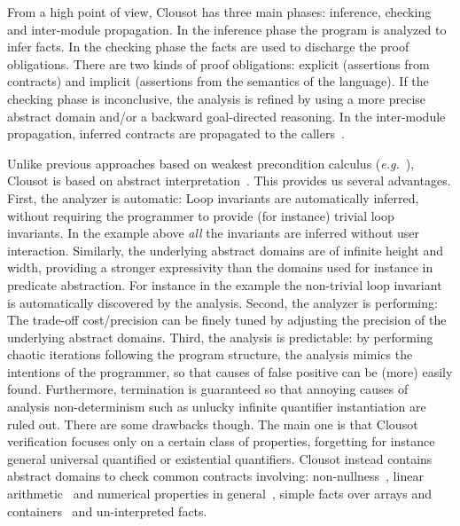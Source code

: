 \documentclass{llncs}
\begin{document}
From a high point of view, Clousot has three main phases: inference, checking and inter-module propagation. 
In the inference phase the program is analyzed to infer facts. 
In the checking phase the facts are used to discharge the proof obligations. 
There are two kinds of proof obligations: explicit (assertions from contracts) and implicit (assertions from the semantics of the language). 
If the checking phase is inconclusive, the analysis is refined by using a more precise abstract domain and/or a backward goal-directed reasoning.
In the inter-module propagation, inferred contracts are propagated to the callers~\cite{CousotCousotLogozzo-Pre}.

Unlike previous approaches based on weakest precondition calculus (\emph{e.g.}~\cite{ESCJava,ChalinEtAl-FMCO05,LeinoBoogie,Jack,Why}), Clousot is based on abstract interpretation~\cite{CousotCousot77}. 
This provides us several advantages. 
First, the analyzer is automatic:  Loop invariants are automatically inferred, without requiring the programmer to provide (for instance) trivial loop invariants. 
In the example above \emph{all} the invariants are inferred without user interaction. 
Similarly, the underlying abstract domains are of infinite height and width, providing a stronger expressivity than the domains used for instance in predicate abstraction. 
For instance in the example the non-trivial loop invariant  is automatically discovered by the analysis. 
Second, the analyzer is performing: The trade-off cost/precision can be finely tuned by adjusting the precision of the underlying abstract domains.  
Third, the analysis is predictable: by performing chaotic iterations following the program structure, the analysis mimics the intentions of the programmer, so that causes of false positive can be (more) easily found. 
Furthermore, termination is guaranteed so that annoying causes of analysis non-determinism such as unlucky infinite quantifier instantiation are ruled out. 
There are some drawbacks though. 
The main one is that Clousot verification focuses only on a certain class of properties, forgetting for instance general universal quantified or existential quantifiers. 
Clousot instead contains abstract domains to check common contracts involving: non-nullness~\cite{MafLeino03}, linear arithmetic~\cite{LogozzoFahndrich08-2,LavironLogozzo09-1,LavironLogozzo9} and numerical properties in general~\cite{FerraraLogozzoFahndrich-OOPSLA08}, simple facts over arrays and containers~\cite{arrayal} and un-interpreted facts.




\end{document}
